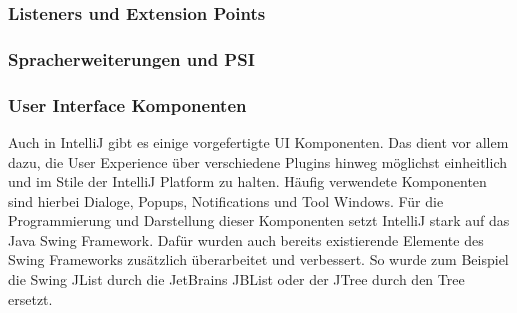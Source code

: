 \subsubsection{Listeners und Extension Points} %

\subsubsection{Spracherweiterungen und PSI}


\subsubsection{User Interface Komponenten}
  Auch in IntelliJ gibt es einige vorgefertigte UI Komponenten. Das dient vor allem dazu, die
  User Experience über verschiedene Plugins hinweg möglichst einheitlich und im Stile
  der IntelliJ Platform zu halten. Häufig verwendete Komponenten sind hierbei Dialoge, Popups,
  Notifications und Tool Windows. Für die Programmierung und Darstellung dieser Komponenten
  setzt IntelliJ stark auf das Java Swing Framework. Dafür wurden auch bereits existierende
  Elemente des Swing Frameworks zusätzlich überarbeitet und verbessert. So wurde zum Beispiel
  die Swing JList durch die JetBrains JBList oder der JTree durch den Tree ersetzt.
